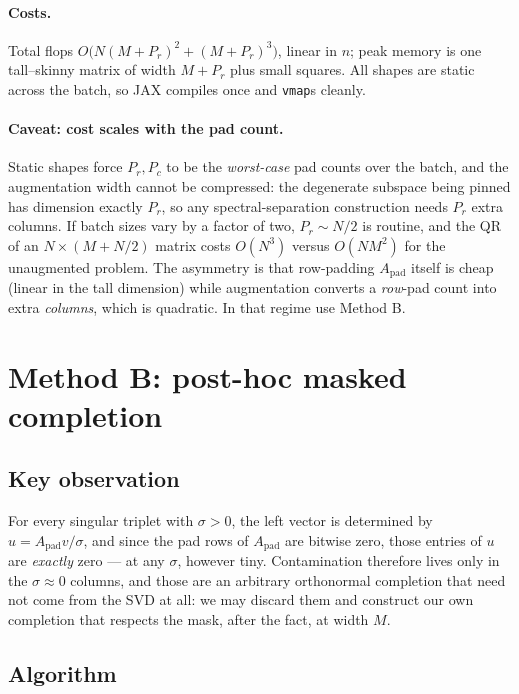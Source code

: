 \documentclass[11pt]{article}
\newcommand{\Apad}{A_{\mathrm{pad}}}
\begin{document}
\paragraph{Costs.} Total flops
$O\!\big(N(M{+}P_r)^2 + (M{+}P_r)^3\big)$, linear in $n$; peak memory is one
tall--skinny matrix of width $M + P_r$ plus small squares. All shapes are static
across the batch, so JAX compiles once and \texttt{vmap}s cleanly.

\paragraph{Caveat: cost scales with the pad count.} Static shapes force
$P_r, P_c$ to be the \emph{worst-case} pad counts over the batch, and the
augmentation width cannot be compressed: the degenerate subspace being pinned
has dimension exactly $P_r$, so any spectral-separation construction needs
$P_r$ extra columns. If batch sizes vary by a factor of two, $P_r \sim N/2$ is
routine, and the QR of an $N \times (M + N/2)$ matrix costs $O(N^3)$ versus
$O(NM^2)$ for the unaugmented problem. The asymmetry is that row-padding
$\Apad$ itself is cheap (linear in the tall dimension) while augmentation
converts a \emph{row}-pad count into extra \emph{columns}, which is quadratic.
In that regime use Method B.

\section{Method B: post-hoc masked completion}\label{sec:completion}

\subsection*{Key observation}

For every singular triplet with $\sigma > 0$, the left vector is determined by
$u = \Apad v / \sigma$, and since the pad rows of $\Apad$ are bitwise zero,
those entries of $u$ are \emph{exactly} zero --- at any $\sigma$, however tiny.
Contamination therefore lives only in the $\sigma \approx 0$ columns, and those
are an arbitrary orthonormal completion that need not come from the SVD at all:
we may discard them and construct our own completion that respects the mask,
after the fact, at width $M$.

\subsection*{Algorithm}
\end{document}
